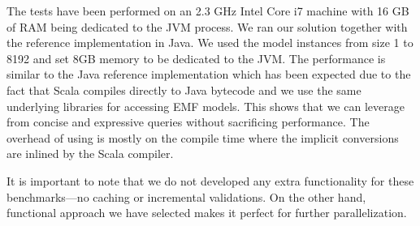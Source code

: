 %
The tests have been performed on an 2.3 GHz Intel Core i7 machine with 16 GB of RAM being dedicated to the JVM process.
We ran our solution together with the reference implementation in Java.
We used the model instances from size 1 to 8192 and set 8GB memory to be dedicated to the JVM.
The performance is similar to the Java reference implementation which has been expected due to the fact that Scala compiles directly to Java bytecode and we use the same underlying libraries for accessing EMF models.
This shows that we can leverage from concise and expressive queries without sacrificing performance.
The overhead of using \SIGMA is mostly on the compile time where the implicit conversions are inlined by the Scala compiler.

It is important to note that we do not developed any extra functionality for these benchmarks---\Ie no caching or incremental validations.
On the other hand, functional approach we have selected makes it perfect for further parallelization.